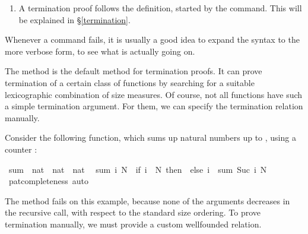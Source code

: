 \begin{isabellebody}
\begin{isamarkuptext}
\begin{enumerate}
  \item A termination proof follows the definition, started by the
   command. This will be explained in \S\ref{termination}.
 \end{enumerate}
  Whenever a  command fails, it is usually a good idea to
  expand the syntax to the more verbose  form, to see
  what is actually going on.%
\end{isamarkuptext}%
\isamarkuptrue%
%
\isamarkuptrue%
%
\begin{isamarkuptext}%
\label{termination}
  The method  is the default method for
  termination proofs. It can prove termination of a
  certain class of functions by searching for a suitable lexicographic
  combination of size measures. Of course, not all functions have such
  a simple termination argument. For them, we can specify the termination
  relation manually.%
\end{isamarkuptext}%
\isamarkuptrue%
%
\isamarkuptrue%
%
\begin{isamarkuptext}%
Consider the following function, which sums up natural numbers up to
  , using a counter :%
\end{isamarkuptext}%
\isamarkuptrue%
\isamarkupfalse%
\ sum\ {}{}\ {}nat\ {}\ nat\ {}\ nat{}\isanewline
{}\isanewline
\ \ {}sum\ i\ N\ {}\ {}if\ i\ {}\ N\ then\ {}\ else\ i\ {}\ sum\ {}Suc\ i{}\ N{}{}\isanewline
%
\isadelimproof
%
\endisadelimproof
%
\isatagproof
{}\isamarkupfalse%
\ pat{}completeness\ auto%
\endisatagproof
{\isafoldproof}%
%
\isadelimproof
%
\endisadelimproof
%
\begin{isamarkuptext}%
\noindent The  method fails on this example, because none of the
  arguments decreases in the recursive call, with respect to the standard size ordering.
  To prove termination manually, we must provide a custom wellfounded relation.


\end{isamarkuptext}
\end{isabellebody}

